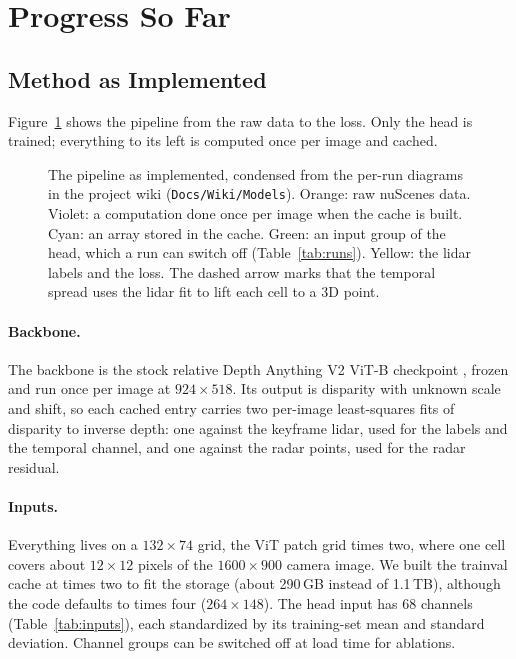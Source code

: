\section{Progress So Far}
\label{sec:progress}

\subsection{Method as Implemented}

Figure~\ref{fig:pipeline} shows the pipeline from the raw data to the loss. Only the head is trained; everything to its left is computed once per image and cached.

\begin{figure}[t]
  \centering
  \resizebox{\textwidth}{!}{}
  \caption{The pipeline as implemented, condensed from the per-run diagrams in the project wiki (\texttt{Docs/Wiki/Models}). Orange: raw nuScenes data. Violet: a computation done once per image when the cache is built. Cyan: an array stored in the cache. Green: an input group of the head, which a run can switch off (Table~\ref{tab:runs}). Yellow: the lidar labels and the loss. The dashed arrow marks that the temporal spread uses the lidar fit to lift each cell to a 3D point.}
  \label{fig:pipeline}
\end{figure}

\paragraph{Backbone.} The backbone is the stock relative Depth Anything V2 ViT-B checkpoint \citep{yang2024depthanythingv2}, frozen and run once per image at $924 \times 518$. Its output is disparity with unknown scale and shift, so each cached entry carries two per-image least-squares fits of disparity to inverse depth: one against the keyframe lidar, used for the labels and the temporal channel, and one against the radar points, used for the radar residual.

\paragraph{Inputs.} Everything lives on a $132 \times 74$ grid, the ViT patch grid times two, where one cell covers about $12 \times 12$ pixels of the $1600 \times 900$ camera image. We built the trainval cache at times two to fit the storage (about 290\,GB instead of 1.1\,TB), although the code defaults to times four ($264 \times 148$). The head input has 68 channels (Table~\ref{tab:inputs}), each standardized by its training-set mean and standard deviation. Channel groups can be switched off at load time for ablations.


